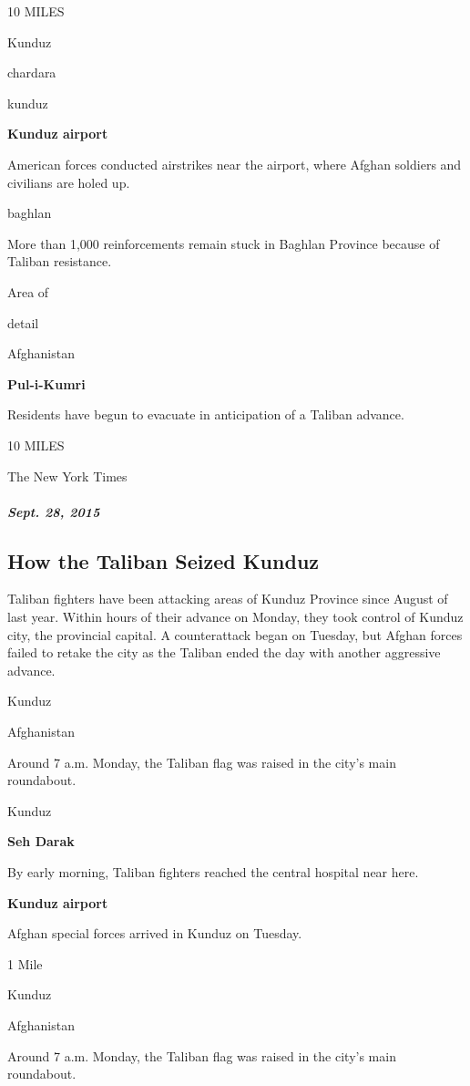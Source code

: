 10 MILES

Kunduz

chardara

kunduz

\textbf{Kunduz airport}

American forces conducted airstrikes near the airport, where Afghan
soldiers and civilians are holed up.

baghlan

More than 1,000 reinforcements remain stuck in Baghlan Province because
of Taliban resistance.

Area of

detail

Afghanistan

\textbf{Pul-i-Kumri}

Residents have begun to evacuate in anticipation of a Taliban advance.

10 MILES

The New York Times

\hypertarget{sept-28-2015}{%
\subparagraph{Sept. 28, 2015}\label{sept-28-2015}}

\hypertarget{how-the-taliban-seized-kunduz}{%
\subsection{How the Taliban Seized
Kunduz}\label{how-the-taliban-seized-kunduz}}

Taliban fighters have been attacking areas of Kunduz Province since
August of last year. Within hours of their advance on Monday, they took
control of Kunduz city, the provincial capital. A counterattack began on
Tuesday, but Afghan forces failed to retake the city as the Taliban
ended the day with another aggressive advance.

Kunduz

Afghanistan

Around 7 a.m. Monday, the Taliban flag was raised in the city's main
roundabout.

Kunduz

\textbf{Seh Darak}

By early morning, Taliban fighters reached the central hospital near
here.

\textbf{Kunduz airport}

Afghan special forces arrived in Kunduz on Tuesday.

1 Mile

Kunduz

Afghanistan

Around 7 a.m. Monday, the Taliban flag was raised in the city's main
roundabout.

